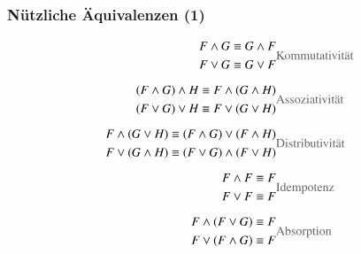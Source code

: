 \documentclass[aspectratio=1610,onlymath]{beamer}
\let\beameroriginaldoublebackslash\\
\let\\=\beameroriginaldoublebackslash
\begin{document}
\begin{frame}\frametitle{Nützliche Äquivalenzen (1)}

\begin{align*}
\begin{split}
F\wedge G & \equiv G\wedge F\\
F\vee G & \equiv G\vee F
\end{split}
		& \text{\textcolor{devilscss}{Kommutativität}} \\[1ex]
%
\begin{split}
(F\wedge G)\wedge H & \equiv F\wedge (G\wedge H)\\
(F\vee G)\vee H & \equiv F\vee (G\vee H)
\end{split}
		& \text{\textcolor{devilscss}{Assoziativität}} \\[1ex]
%
\begin{split}
F\wedge (G\vee H) & \equiv (F\wedge G) \vee (F\wedge H)\\
F\vee (G\wedge H) & \equiv (F\vee G)\wedge (F\vee H)
\end{split}
		& \text{\textcolor{devilscss}{Distributivität}} \\[1ex]
%
\begin{split}
F\wedge F & \equiv F\\
F\vee F & \equiv F
\end{split}
		& \text{\textcolor{devilscss}{Idempotenz}} \\[1ex]
%
\begin{split}
F\wedge (F\vee G) & \equiv F\\
F\vee (F\wedge G) & \equiv F
\end{split}
		& \text{\textcolor{devilscss}{Absorption}}
\end{align*}

\end{frame}
\end{document}
